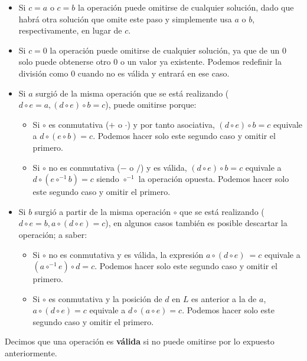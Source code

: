 \begin{itemize}
	\item Si $c = a$ o $c = b$ la operación puede omitirse de cualquier solución,
	dado que habrá otra solución que omite este paso y simplemente usa $a$ o $b$, respectivamente, en lugar de $c$.
	\item Si $c = 0$ la operación puede omitirse de cualquier solución, ya que de
	un 0 solo puede obtenerse otro 0 o un valor ya existente. Podemos redefinir
	la división como 0 cuando no es válida y entrará en ese caso.
	\item Si $a$ surgió de la misma operación que se está realizando
  ($d \circ e = a, (d \circ e) \circ b = c$),
  puede omitirse porque:
	\begin{itemize}
		\item Si $\circ$ es conmutativa ($+$ o $\cdot$) y por tanto asociativa,
		$(d \circ e) \circ b = c$ equivale a $d \circ (e \circ b) = c$.
		Podemos hacer solo este segundo caso y omitir el primero.
		\item Si $\circ$ no es conmutativa ($-$ o $/$) y es válida,
		$(d \circ e) \circ b = c$ equivale a $d \circ (e \circ^{-1} b) = c$
		siendo $\circ^{-1}$ la operación opuesta. Podemos hacer solo este segundo caso y omitir el primero.
	\end{itemize}
	\item Si $b$ surgió a partir de la misma operación $\circ$ que se está realizando
	($d \circ e = b, a \circ (d \circ e) = c$),
	en algunos casos también es posible descartar la operación; a saber:
	\begin{itemize}
		\item Si $\circ$ no es conmutativa y es válida, la expresión
		$a \circ (d \circ e)\ = c$ equivale a $(a \circ^{-1} e) \circ d = c$.
		Podemos hacer solo este segundo caso y omitir el primero.
		\item Si $\circ$ es conmutativa y la posición de $d$ en $L$ es anterior a la de $a$, $a \circ (d \circ e) = c$	equivale a $d \circ (a \circ e) = c$.
		Podemos hacer solo este segundo caso y omitir el primero.
	\end{itemize}
\end{itemize}

Decimos que una operación es \textbf{válida} si no puede omitirse por lo
expuesto anteriormente.